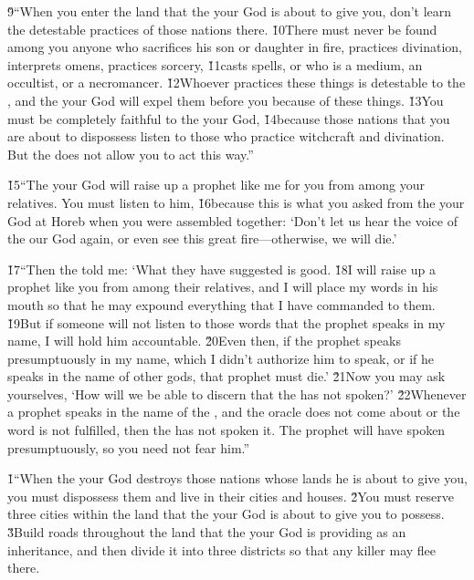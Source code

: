 \v{9}``When you enter the land that the  your God is about to give you, don't learn the detestable practices of those nations there. \v{10}There must never be found among you anyone who sacrifices his son or daughter in fire, practices divination, interprets omens, practices sorcery, \v{11}casts spells, or who is a medium, an occultist, or a necromancer. \v{12}Whoever practices these things is detestable to the , and the  your God will expel them before you because of these things. \v{13}You must be completely faithful to the  your God, \v{14}because those nations that you are about to dispossess listen to those who practice witchcraft and divination. But the  does not allow you to act this way.''

\v{15}``The  your God will raise up a prophet like me for you from among your relatives. You must listen to him, \v{16}because this is what you asked from the  your God at Horeb when you were assembled together: `Don't let us hear the voice of the  our God again, or even see this great fire---otherwise, we will die.'

\v{17}``Then the  told me: `What they have suggested is good. \v{18}I will raise up a prophet like you from among their relatives, and I will place my words in his mouth so that he may expound everything that I have commanded to them. \v{19}But if someone will not listen to those words that the prophet speaks in my name, I will hold him accountable. \v{20}Even then, if the prophet speaks presumptuously in my name, which I didn't authorize him to speak, or if he speaks in the name of other gods, that prophet must die.' \v{21}Now you may ask yourselves, `How will we be able to discern that the  has not spoken?' \v{22}Whenever a prophet speaks in the name of the , and the oracle does not come about or the word is not fulfilled, then the  has not spoken it. The prophet will have spoken presumptuously, so you need not fear him.''

\v{1}``When the  your God destroys those nations whose lands he is about to give you, you must dispossess them and live in their cities and houses. \v{2}You must reserve three cities within the land that the  your God is about to give you to possess. \v{3}Build roads throughout the land that the  your God is providing as an inheritance, and then divide it into three districts so that any killer may flee there.


